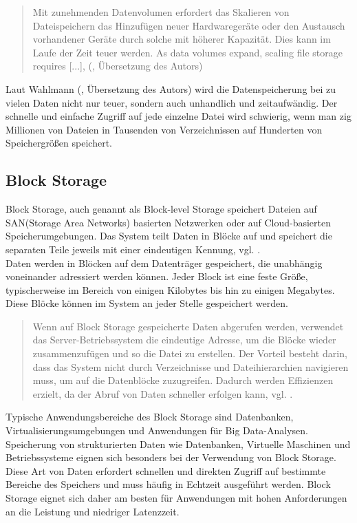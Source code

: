 \begin{quote}
	Mit zunehmenden Datenvolumen erfordert das Skalieren von Dateispeichern das Hinzufügen neuer Hardwaregeräte oder den Austausch vorhandener Geräte durch solche mit höherer Kapazität. Dies kann im Laufe der Zeit teuer werden. \glqq As data volumes expand, scaling file storage requires [...]\grqq, (\cite{nx-fileScala}, Übersetzung des Autors)
\end{quote}

Laut Wahlmann (\citeyear{nx-fileScala}, Übersetzung des Autors) wird die Datenspeicherung bei zu vielen Daten nicht nur teuer, sondern auch unhandlich und zeitaufwändig. Der schnelle und einfache Zugriff auf jede einzelne Datei wird schwierig, wenn man zig Millionen von Dateien in Tausenden von Verzeichnissen auf Hunderten von Speichergrößen speichert. 

\subsection{Block Storage}

Block Storage, auch genannt als Block-level Storage speichert Dateien auf SAN(Storage Area Networks) basierten Netzwerken oder auf Cloud-basierten Speicherumgebungen. Das System teilt Daten in Blöcke auf und speichert die separaten Teile jeweils mit einer eindeutigen Kennung, vgl. \cite{ibm-topics}.\\

Daten werden in Blöcken auf dem Datenträger gespeichert, die unabhängig voneinander adressiert werden können. Jeder Block ist eine feste Größe, typischerweise im Bereich von einigen Kilobytes bis hin zu einigen Megabytes. Diese Blöcke können im System an jeder Stelle gespeichert werden.

\begin{quote}
	Wenn auf Block Storage gespeicherte Daten abgerufen werden, verwendet das Server-Betriebssystem die eindeutige Adresse, um die Blöcke wieder zusammenzufügen und so die Datei zu erstellen. Der Vorteil besteht darin, dass das System nicht durch Verzeichnisse und Dateihierarchien navigieren muss, um auf die Datenblöcke zuzugreifen. Dadurch werden Effizienzen erzielt, da der Abruf von Daten schneller erfolgen kann, vgl. \cite{ibm-storage}.
\end{quote}

Typische Anwendungsbereiche des Block Storage sind Datenbanken, Virtualisierungsumgebungen und Anwendungen für Big Data-Analysen. Speicherung von strukturierten Daten wie Datenbanken, Virtuelle Maschinen und Betriebssysteme eignen sich besonders bei der Verwendung von Block Storage. Diese Art von Daten erfordert schnellen und direkten Zugriff auf bestimmte Bereiche des Speichers und muss häufig in Echtzeit ausgeführt werden. Block Storage eignet sich daher am besten für Anwendungen mit hohen Anforderungen an die Leistung und niedriger Latenzzeit.

